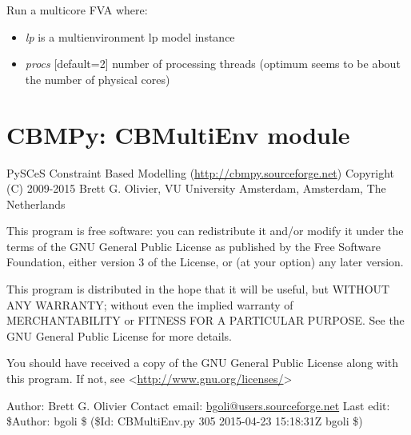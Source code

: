 \documentclass[a4paper,11pt,english]{sphinxmanual}
\begin{document}

\begin{fulllineitems}
\label{modules_doc:cbmpy.CBMultiCore.runMultiCoreMultiEnvFVA}
Run a multicore FVA where:
\begin{itemize}
\item {} 
\emph{lp} is a multienvironment lp model instance

\item {} 
\emph{procs} {[}default=2{]} number of processing threads (optimum seems to be about the number of physical cores)

\end{itemize}

\end{fulllineitems}

\label{modules_doc:module-cbmpy.CBMultiEnv}

\section{CBMPy: CBMultiEnv module}
\label{modules_doc:cbmpy-cbmultienv-module}
PySCeS Constraint Based Modelling (\href{http://cbmpy.sourceforge.net}{http://cbmpy.sourceforge.net})
Copyright (C) 2009-2015 Brett G. Olivier, VU University Amsterdam, Amsterdam, The Netherlands

This program is free software: you can redistribute it and/or modify
it under the terms of the GNU General Public License as published by
the Free Software Foundation, either version 3 of the License, or
(at your option) any later version.

This program is distributed in the hope that it will be useful,
but WITHOUT ANY WARRANTY; without even the implied warranty of
MERCHANTABILITY or FITNESS FOR A PARTICULAR PURPOSE.  See the
GNU General Public License for more details.

You should have received a copy of the GNU General Public License
along with this program.  If not, see \textless{}\href{http://www.gnu.org/licenses/}{http://www.gnu.org/licenses/}\textgreater{}

Author: Brett G. Olivier
Contact email: \href{mailto:bgoli@users.sourceforge.net}{bgoli@users.sourceforge.net}
Last edit: \$Author: bgoli \$ (\$Id: CBMultiEnv.py 305 2015-04-23 15:18:31Z bgoli \$)
\label{modules_doc:module-cbmpy.CBNetDB}
\end{document}
